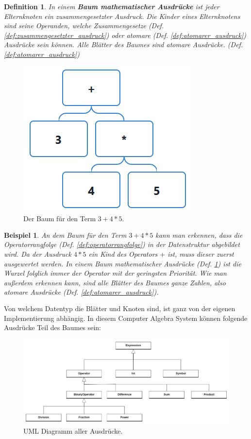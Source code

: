 \documentclass[11pt]{article}
\newtheorem{defin}{Definition}
\newcommand{\lab}[1]{(Def. \ref{#1})}
\newtheorem{example}{Beispiel}
\begin{document}
\begin{defin}
In einem \textbf{Baum mathematischer Ausdrücke} ist jeder Elternknoten ein zusammengesetzter Ausdruck. Die Kinder
eines Elternknotens sind seine Operanden, welche Zusammengesetze \lab{def:zusammengesetzter_ausdruck} oder atomare 
\lab{def:atomarer_ausdruck} Ausdrücke sein können. Alle Blätter des Baumes sind atomare Ausdrücke. \lab{def:atomarer_ausdruck}
\label{def:baum}
\end{defin}

\begin{figure}[h]
  \centering
  \includegraphics[scale=0.5]{trees/beispiel_1_baum.png}
  \caption{Der Baum für den Term $3+4*5$.}
\end{figure}

\begin{example}
   An dem Baum für den Term $3+4*5$ kann man erkennen, dass die Operatorrangfolge \lab{def:operatorrangfolge}
   in der Datenstruktur abgebildet wird. Da der Ausdruck $4*5$ ein Kind des Operators $+$ ist, muss dieser zuerst 
   ausgewertet werden. In einem Baum mathematischer Ausdrücke \lab{def:baum} ist die Wurzel folglich immer
   der Operator mit der geringsten Priorität.
   Wie man außerdem erkennen kann, sind alle Blätter des Baumes ganze Zahlen, also atomare Ausdrücke \lab{def:atomarer_ausdruck}.
\end{example}

Von welchem Datentyp die Blätter und Knoten sind, ist ganz von der eigenen Implementierung abhängig.
In diesem Computer Algebra System können folgende Ausdrücke Teil des Baumes sein:

\begin{figure}[h]
  \centering
  \includegraphics[scale=0.25]{UML_Ausdruecke.png}
  \caption{UML Diagramm aller Ausdrücke.}
\end{figure}
\end{document}
